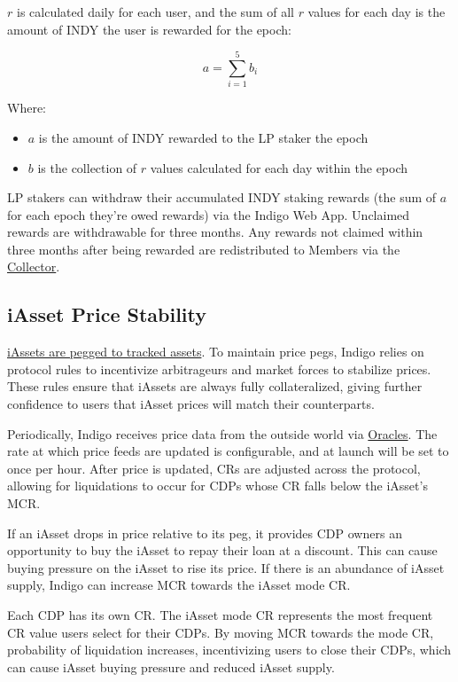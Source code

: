\documentclass{article}
\begin{document}
\begin{sloppypar}
\(r\) is calculated daily for each user, and the sum of all \(r\) values
for each day is the amount of INDY the user is rewarded for the epoch:

\[a = \sum_{i = 1}^{5}b_{i}\]

Where:

\begin{itemize}
\item
  \(a\) is the amount of INDY rewarded to the LP staker the epoch
\item
  \(b\) is the collection of \(r\) values calculated for each day within
  the epoch
\end{itemize}

LP stakers can withdraw their accumulated INDY staking rewards (the sum
of \(a\) for each epoch they're owed rewards) via the Indigo Web App.
Unclaimed rewards are withdrawable for three months. Any rewards not
claimed within three months after being rewarded are redistributed to
Members via the \protect\hyperlink{protocol-profit-sharing}{Collector}.

\hypertarget{iasset-price-stability}{%
\subsection{iAsset Price Stability}\label{iasset-price-stability}}

\protect\hyperlink{synthetic-assets}{iAssets are pegged to tracked
assets}. To maintain price pegs, Indigo relies on protocol rules to
incentivize arbitrageurs and market forces to stabilize prices. These
rules ensure that iAssets are always fully collateralized, giving
further confidence to users that iAsset prices will match their
counterparts.

Periodically, Indigo receives price data from the outside world via
\protect\hyperlink{oracles}{Oracles}. The rate at which price feeds are
updated is configurable, and at launch will be set to once per hour.
After price is updated, CRs are adjusted across the protocol, allowing
for liquidations to occur for CDPs whose CR falls below the iAsset's
MCR.

If an iAsset drops in price relative to its peg, it provides CDP owners
an opportunity to buy the iAsset to repay their loan at a discount. This
can cause buying pressure on the iAsset to rise its price. If there is
an abundance of iAsset supply, Indigo can increase MCR towards the
iAsset mode CR.

Each CDP has its own CR. The iAsset mode CR represents the most frequent
CR value users select for their CDPs. By moving MCR towards the mode CR,
probability of liquidation increases, incentivizing users to close their
CDPs, which can cause iAsset buying pressure and reduced iAsset supply.


\end{sloppypar}
\end{document}

